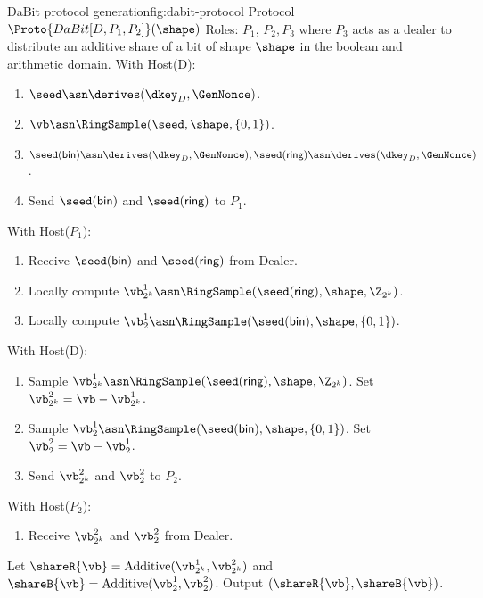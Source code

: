 \begin{Boxfig}{DaBit protocol generation}{fig:dabit-protocol}
  {Protocol $\Proto{DaBit[D, P_1, P_2]}(\shape)$}
  Roles: $P_1$, $P_2, P_3$ where $P_3$ acts as a dealer to distribute
  an additive share of a bit of shape $\shape$ in the boolean and arithmetic domain. \newline
  With Host(D):
  \begin{enumerate}
    \item $\seed \asn \derives(\dkey_D, \GenNonce)$.
    \item $\vb \asn \RingSample(\seed, \shape, \{0, 1\})$.
    \item $\seed(\textsf{bin}) \asn \derives(\dkey_D, \GenNonce), \seed(\textsf{ring}) \asn \derives(\dkey_D, \GenNonce)$.
    \item Send $\seed(\textsf{bin})$ and $\seed(\textsf{ring})$ to $P_1$.

  \end{enumerate}
 With Host($P_1$):
 \begin{enumerate}
     \item Receive $\seed(\textsf{bin})$ and $\seed(\textsf{ring})$ from Dealer.
     \item Locally compute $\vb^1_{2^k} \asn \RingSample(\seed(\textsf{ring}), \shape, \Z_{2^k})$.
     \item Locally compute $\vb^1_{2} \asn \RingSample(\seed(\textsf{bin}), \shape, \{0, 1\})$.
 \end{enumerate}
With Host(D):
\begin{enumerate}
    \item Sample $\vb^1_{2^k} \asn \RingSample(\seed(\textsf{ring}), \shape, \Z_{2^k})$. Set $\vb^2_{2^k} = \vb - \vb^1_{2^k}$.
    \item Sample $\vb^1_{2} \asn \RingSample(\seed(\textsf{bin}), \shape, \{0, 1\})$. Set $\vb^2_{2} = \vb - \vb^1_{2}$. 
    \item Send $\vb^2_{2^k}$ and $\vb^2_2$ to $P_2$.
\end{enumerate}
With Host($P_2$):
\begin{enumerate}
    \item Receive $\vb^2_{2^k}$ and $\vb^2_2$ from Dealer.
\end{enumerate}
Let $\shareR{\vb} = \text{Additive}(\vb^1_{2^k}, \vb^2_{2^k})$ and $\shareB{\vb} = \text{Additive}(\vb^1_2, \vb^2_2)$. Output $(\shareR{\vb}, \shareB{\vb})$.
\end{Boxfig}

